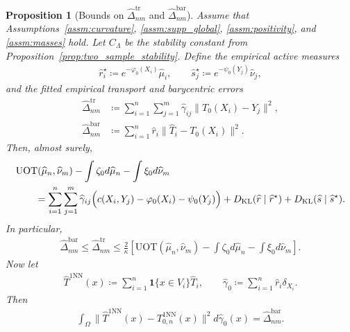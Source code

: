 \documentclass[10pt,a4paper]{amsart}
\newtheorem{proposition}{Proposition}
\newcommand{\KL}{\mathrm{KL}}
\renewcommand{\hat}{\widehat}
\begin{document}
\begin{proposition}[Bounds on $\hat\Delta_{nm}^{\mathrm{tr}}$ and $\hat\Delta_{nm}^{\mathrm{bar}}$]
\label{prop:uot_barycentric_and_1nn_estimated_mass}
Assume that Assumptions~\ref{assm:curvature}, \ref{assm:supp_global}, \ref{assm:positivity}, and \ref{assm:masses} hold.
Let $C_\Lambda$ be the stability constant from Proposition~\ref{prop:two_sample_stability}.
Define the empirical active measures
\begin{align}
    \hat r_i^\star \coloneqq e^{-\varphi_0(X_i)}\hat\mu_i,
    \qquad
    \hat s_j^\star \coloneqq e^{-\psi_0(Y_j)}\hat\nu_j,
\end{align}
and the fitted empirical transport and barycentric errors
\begin{align}
    \hat\Delta_{nm}^{\mathrm{tr}}
    &\coloneqq
    \sum_{i=1}^n\sum_{j=1}^m
    \hat\gamma_{ij}\|T_0(X_i)-Y_j\|^2, \\
    \hat\Delta_{nm}^{\mathrm{bar}}
    &\coloneqq
    \sum_{i=1}^n \hat r_i \|\hat T_i-T_0(X_i)\|^2.
\end{align}
Then, almost surely,
\begin{equation}
\label{eq:uot_hat_exact_empirical_excess}
\begin{aligned}
&\mathrm{UOT}(\hat\mu_n,\hat\nu_m)
- \int \zeta_0   d\hat\mu_n
- \int \xi_0   d\hat\nu_m \\
&\qquad=
\sum_{i=1}^n\sum_{j=1}^m
\hat\gamma_{ij}
\Bigl(
c(X_i,Y_j)-\varphi_0(X_i)-\psi_0(Y_j)
\Bigr)
+ {D_\KL}(\hat r \mid \hat r^\star)
+ {D_\KL}(\hat s \mid \hat s^\star).
\end{aligned}
\end{equation}
In particular,
\begin{align}
\label{eq:uot_hat_barycentric_delta_bound}
    \hat\Delta_{nm}^{\mathrm{bar}}
    \le
    \hat\Delta_{nm}^{\mathrm{tr}}
    \le
    \frac{2}{\kappa}
    \left[
        \mathrm{UOT}(\hat\mu_n,\hat\nu_m)
        - \int \zeta_0   d\hat\mu_n
        - \int \xi_0   d\hat\nu_m
    \right].
\end{align}
Now let
\begin{align}
    \hat T^{\mathrm{1NN}}(x)
    \coloneqq
    \sum_{i=1}^n \mathbf{1}\{x\in V_i\}\hat T_i,
    \qquad
    \hat\gamma_0 \coloneqq \sum_{i=1}^n \hat r_i \delta_{X_i}.
\end{align}
Then
\begin{align}
\label{eq:uot_hat_1nn_identity_active_empirical}
    \int_\Omega \|\hat T^{\mathrm{1NN}}(x)-T_{0,n}^{\mathrm{1NN}}(x)\|^2   d\hat\gamma_0(x)
    =
    \hat\Delta_{nm}^{\mathrm{bar}}.

\end{align}
\end{proposition}
\end{document}
